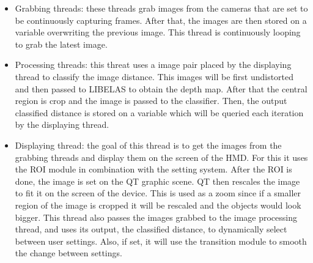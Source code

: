\documentclass[10pt,a4paper,twocolumn,twoside]{article}
\begin{document}
	\begin{itemize}
		\item Grabbing threads: these threads grab images from the cameras that are set to be continuously capturing frames. After that, the images are then stored on a variable overwriting the previous image. This thread is continuously looping to grab the latest image. 
		
		\item Processing threads: this threat uses a image pair placed by the displaying thread to classify the image distance. This images will be first undistorted and then passed to LIBELAS to obtain the depth map. After that the central region is crop and the image is passed to the classifier. Then, the output classified distance is stored on a variable which will be queried each iteration by the displaying thread.  
		
		\item Displaying thread: the goal of this thread is to get the images from the grabbing threads and display them on the screen of the HMD. For this it uses the ROI module in combination with the setting system. After the ROI is done, the image is set on the QT graphic scene. QT then rescales the image to fit it on the screen of the device. This is used as a zoom since if a smaller region of the image is cropped it will be rescaled and the objects would look bigger. This thread also passes the images grabbed to the image processing thread, and uses its output, the classified distance, to dynamically select between user settings. Also, if set, it will use the transition module to smooth the change between settings. 
		
	\end{itemize}
	
\end{document}
